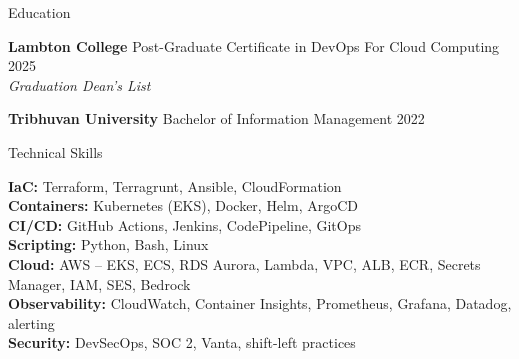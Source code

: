 \documentclass{resume}
\begin{document}

\begin{rSection}{Education}

\textbf{Lambton College} \textbar{} Post-Graduate Certificate in DevOps For Cloud Computing \hfill 2025 \\
\textit{Graduation Dean's List}

\textbf{Tribhuvan University} \textbar{} Bachelor of Information Management \hfill 2022

\end{rSection}


\begin{rSection}{Technical Skills}

\textbf{IaC:} Terraform, Terragrunt, Ansible, CloudFormation \\
\textbf{Containers:} Kubernetes (EKS), Docker, Helm, ArgoCD \\
\textbf{CI/CD:} GitHub Actions, Jenkins, CodePipeline, GitOps \\
\textbf{Scripting:} Python, Bash, Linux \\
\textbf{Cloud:} AWS -- EKS, ECS, RDS Aurora, Lambda, VPC, ALB, ECR, Secrets Manager, IAM, SES, Bedrock \\
\textbf{Observability:} CloudWatch, Container Insights, Prometheus, Grafana, Datadog, alerting \\
\textbf{Security:} DevSecOps, SOC 2, Vanta, shift-left practices \\

\end{rSection}

\end{document}
